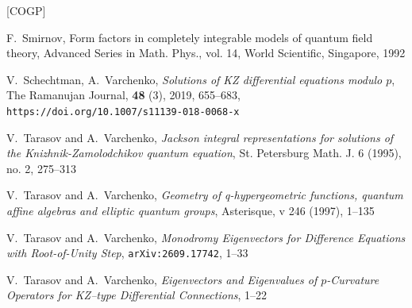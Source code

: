 \documentclass[12pt]{amsart}
\theoremstyle{definition} %
\numberwithin{equation}{section}
\theoremstyle{definition}
\let\bi\bibitem
\begin{document}
\begin{thebibliography}{[COGP]}



\bi[S]{S} F.~Smirnov, {Form factors in completely integrable models of quantum field theory}, 
Advanced Series in Math. Phys., vol. 14, World Scientific, Singapore, 1992


\bi[SV]{SV} V.~Schechtman, A.~Varchenko,
{\it
Solutions of KZ differential equations modulo $p$},
The Ramanujan Journal,
{\bf 48} (3), 2019, 655--683,
{\tt https://doi.org/10.1007/s11139-018-0068-x}



\bi[TV1]{TV1}
V.~Tarasov and A.~Varchenko, {\it
Jackson integral representations for solutions of the Knizhnik-Zamolodchikov quantum equation},
St. Petersburg Math. J. 6 (1995), no. 2, 275--313

\bi[TV2]{TV2}
V.~Tarasov and A.~Varchenko,
{\it
Geometry of q-hypergeometric functions, quantum affine algebras and elliptic quantum groups},
Asterisque, v 246 (1997), 1--135

\bi[TV3]{TV3}
V.~Tarasov and A.~Varchenko,
{\it Monodromy Eigenvectors for Difference Equations with Root-of-Unity Step}, 
{\tt arXiv:2609.17742}, 1--33



\bi[TV4]{TV4}
V.~Tarasov and A.~Varchenko,
{\it Eigenvectors and Eigenvalues of $p$-Curvature
Operators for
KZ--type Differential Connections}, 1--22


\end{thebibliography}
\end{document}
